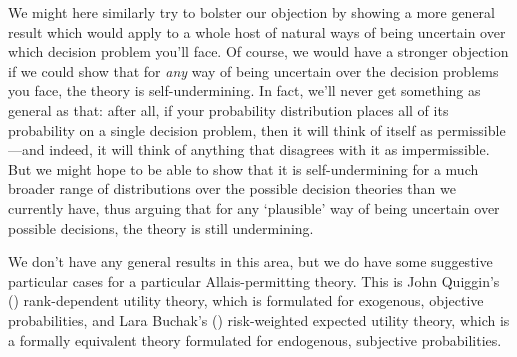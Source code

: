 \documentclass[a4paper]{article}
\newcommand{\todoold}[2][]{\todo[backgroundcolor=white,bordercolor=orange!10,linecolor=gray!10, #1,caption={},textcolor=gray]{Pre-rev: #2}}
\renewcommand{\color}[1]{}
\newenvironment{CCM rewritten}
{\begingroup\color{blue}} %
{\endgroup}              %
\begin{document}
We might here similarly try to bolster our objection by showing a more general result which would apply to a whole host of natural ways of being uncertain over which decision problem you'll face. 
Of course, we would have a stronger objection if we could show that for \emph{any} way of being uncertain over the decision problems you face, the theory is self-undermining. In fact, we'll never get something as general as that: after all, if your probability distribution places all of its probability on a single decision problem, then it will think of itself as permissible---and indeed, it will think of anything that disagrees with it as impermissible. But we might hope to be able to show that it is self-undermining for a much broader range of distributions over the possible decision theories than we currently have, thus arguing that for any `plausible' way of being uncertain over possible decisions, the theory is still undermining. 


We don't have any general results in this area, but we do have some suggestive particular cases for a particular Allais-permitting theory. This is John Quiggin's (\citeyear{quiggin1982tau,quiggin1993geut}) rank-dependent utility theory, which is formulated for exogenous, objective probabilities, and Lara Buchak's (\citeyear{buchak2014rr}) risk-weighted expected utility theory, which is a formally equivalent theory formulated for endogenous, subjective probabilities.
\end{document}
